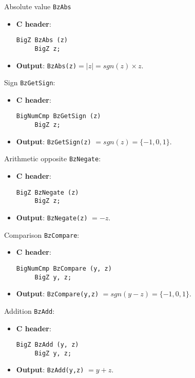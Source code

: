\begin{func} Absolute value \verb+BzAbs+
\begin{itemize}
   \item {\bf C header}: 
\begin{verbatim}
BigZ BzAbs (z)  
     BigZ z;
\end{verbatim}
   \item {\bf Output}: \verb+BzAbs(z)+$= |z| = sgn(z) \times z.$
\end{itemize}
\end{func}
 
\begin{func} Sign  \verb+BzGetSign+:
\begin{itemize}
  \item{\bf C header}:
\begin{verbatim}
BigNumCmp BzGetSign (z) 
     BigZ z;
\end{verbatim}
  \item{\bf Output}: \verb+BzGetSign(z)+ $= sgn(z) = \{ -1,0,1 \}$.
\end{itemize}
\end{func}
 
 
\begin{func} Arithmetic opposite  \verb+BzNegate+:
\begin{itemize}
  \item{\bf C header}:
\begin{verbatim}
BigZ BzNegate (z)       
     BigZ z;
\end{verbatim}
  \item{\bf Output}: \verb+BzNegate(z)+ $= -z  $.
\end{itemize}
\end{func}
 
 
\begin{func} Comparison  \verb+BzCompare+:
\begin{itemize}
  \item{\bf C header}:
\begin{verbatim}
BigNumCmp BzCompare (y, z)
     BigZ y, z;
\end{verbatim}
  \item{\bf Output}: \verb+BzCompare(y,z)+ $= sgn(y-z) = \{ -1,0,1 \}$.
\end{itemize}
\end{func}
 
 
\begin{func} Addition  \verb+BzAdd+:
\begin{itemize}
  \item{\bf C header}:
\begin{verbatim}
BigZ BzAdd (y, z)       
     BigZ y, z;
\end{verbatim}
  \item{\bf Output}: \verb+BzAdd(y,z)+ $= y+z  $.
\end{itemize}
\end{func}
 
